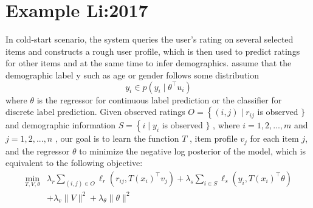 \documentclass[nosupp]{cup-ino}
\begin{document}
\section{Example  Li:2017}
In cold-start scenario, the system queries the user’s rating on several selected items and constructs a rough user profile, which is then used to predict ratings for other items and at the same time to infer demographics.
assume that the demographic label y such as age or gender follows some distribution
\begin{equation}
y_{i} \in p\left(y_{i} \mid \theta^{\top} u_{i}\right)
\end{equation}
where $\theta$  is the regressor for continuous label prediction or the classifier for discrete label prediction.
Given observed ratings $O=\left\{(i, j) \mid r_{i j}\right.$ is observed $\}$ and demographic information $S=\left\{i \mid y_{i}\right.$ is observed $\}$ , where $i = 1, 2, . . . ,m$ and $j = 1, 2, . . . ,n$ , our goal is to learn the function $T$ , item profile $v_{j}$ for each item $j$, and the regressor $\theta$ to minimize the negative
log posterior of the model, which is equivalent to the following objective:
\begin{equation}
\begin{aligned}
\min _{T, V, \theta} & \lambda_{r} \sum_{(i, j) \in O} \ell_{r}\left(r_{i j}, T\left(x_{i}\right)^{\top} v_{j}\right)+\lambda_{s} \sum_{i \in S} \ell_{s}\left(y_{i}, T\left(x_{i}\right)^{\top} \theta\right) \\
&+\lambda_{v}\|V\|^{2}+\lambda_{\theta}\|\theta\|^{2}
\end{aligned}
\end{equation}




\printbibliography
\end{document}
